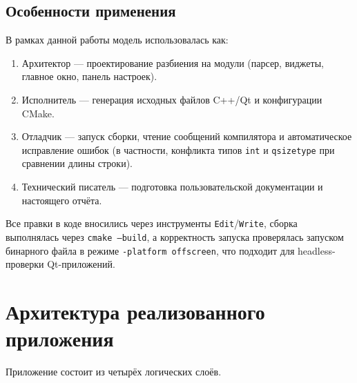 \documentclass[a4paper, final]{article}
\begin{document}
\subsection{Особенности применения}

В рамках данной работы модель использовалась как:
\begin{enumerate}
    \item Архитектор --- проектирование разбиения на модули
          (парсер, виджеты, главное окно, панель настроек).
    \item Исполнитель --- генерация исходных файлов C++/Qt
          и конфигурации CMake.
    \item Отладчик --- запуск сборки, чтение сообщений компилятора
          и автоматическое исправление ошибок (в частности, конфликта
          типов \texttt{int} и \texttt{qsizetype} при сравнении длины строки).
    \item Технический писатель --- подготовка пользовательской
          документации и настоящего отчёта.
\end{enumerate}

Все правки в коде вносились через инструменты \texttt{Edit}/\texttt{Write},
сборка выполнялась через \texttt{cmake --build}, а корректность запуска
проверялась запуском бинарного файла в режиме \texttt{-platform offscreen},
что подходит для headless-проверки Qt-приложений.

\newpage

\section{Архитектура реализованного приложения}

Приложение состоит из четырёх логических слоёв.
\end{document}
